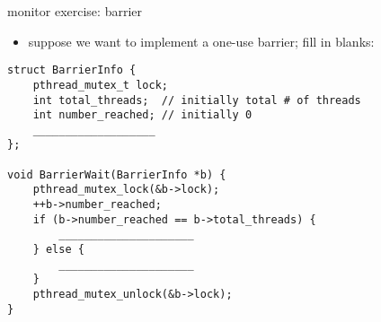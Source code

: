 \begin{frame}[fragile,label=monitorExercise2]{monitor exercise: barrier}
\begin{itemize}
\item suppose we want to implement a one-use barrier; fill in blanks:
\end{itemize}
\begin{lstlisting}[style=smaller]
struct BarrierInfo {
    pthread_mutex_t lock;
    int total_threads;  // initially total # of threads
    int number_reached; // initially 0
    ___________________
};

void BarrierWait(BarrierInfo *b) {
    pthread_mutex_lock(&b->lock);
    ++b->number_reached;
    if (b->number_reached == b->total_threads) {
        _____________________
    } else {
        _____________________
    }
    pthread_mutex_unlock(&b->lock);
}
\end{lstlisting}
\end{frame}
